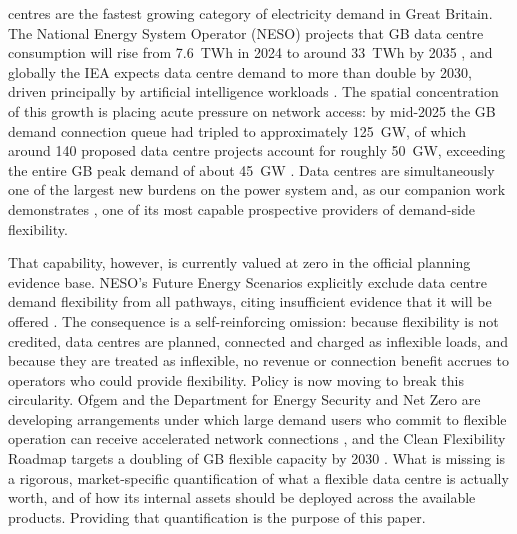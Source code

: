 \documentclass[lettersize,journal]{IEEEtran}
\begin{document}
 centres are the fastest growing category of electricity demand in Great Britain. The National Energy System Operator (NESO) projects that GB data centre consumption will rise from 7.6~TWh in 2024 to around 33~TWh by 2035 \cite{neso2025fes}, and globally the IEA expects data centre demand to more than double by 2030, driven principally by artificial intelligence workloads \cite{iea_energy_ai}. The spatial concentration of this growth is placing acute pressure on network access: by mid-2025 the GB demand connection queue had tripled to approximately 125~GW, of which around 140 proposed data centre projects account for roughly 50~GW, exceeding the entire GB peak demand of about 45~GW \cite{neso2025connections,desnz2026strategicdemand}. Data centres are simultaneously one of the largest new burdens on the power system and, as our companion work demonstrates \cite{takci2026characterisation}, one of its most capable prospective providers of demand-side flexibility.

That capability, however, is currently valued at zero in the official planning evidence base. NESO's Future Energy Scenarios explicitly exclude data centre demand flexibility from all pathways, citing insufficient evidence that it will be offered \cite{neso2025fes,eca2025hole}. The consequence is a self-reinforcing omission: because flexibility is not credited, data centres are planned, connected and charged as inflexible loads, and because they are treated as inflexible, no revenue or connection benefit accrues to operators who could provide flexibility. Policy is now moving to break this circularity. Ofgem and the Department for Energy Security and Net Zero are developing arrangements under which large demand users who commit to flexible operation can receive accelerated network connections \cite{desnz2026strategicdemand,ofgem2025tm04}, and the Clean Flexibility Roadmap targets a doubling of GB flexible capacity by 2030 \cite{clean_flexibility_roadmap}. What is missing is a rigorous, market-specific quantification of what a flexible data centre is actually worth, and of how its internal assets should be deployed across the available products. Providing that quantification is the purpose of this paper.
\end{document}

